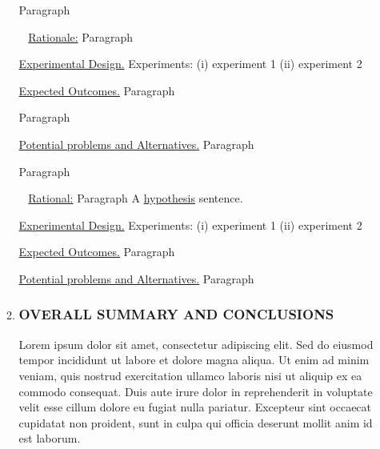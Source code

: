 \documentclass[11pt]{article}
\newcommand{\myparagraph}[1]{\vspace{0.5ex}\noindent{\bf #1} ~}
\begin{document}
\begin{enumerate}[wide, labelindent=0pt]
\begin{enumerate}[wide, labelindent=0pt]
        Paragraph

        \myparagraph{Aim 3.1 }
        \underline{Rationale:} 
        Paragraph

        \underline{Experimental Design.} 
        Experiments: 
        (i) experiment 1
        (ii) experiment 2

        \underline{Expected Outcomes.} 
        Paragraph

        Paragraph

        \underline{Potential problems and Alternatives.} 
        Paragraph

        Paragraph

        \myparagraph{Aim 3.2 }
        \underline{Rational:} 
        Paragraph
        A \underline{hypothesis} sentence.
        
        \underline{Experimental Design.} 
        Experiments: 
        (i) experiment 1
        (ii) experiment 2
        
        \underline{Expected Outcomes.}
        Paragraph

        \underline{Potential problems and Alternatives.} 
        Paragraph
        
        
    \item \subsubsection*{OVERALL SUMMARY AND CONCLUSIONS}
        Lorem ipsum dolor sit amet, consectetur adipiscing elit. Sed do eiusmod tempor incididunt ut labore et dolore magna aliqua. Ut enim ad minim veniam, quis nostrud exercitation ullamco laboris nisi ut aliquip ex ea commodo consequat. Duis aute irure dolor in reprehenderit in voluptate velit esse cillum dolore eu fugiat nulla pariatur. Excepteur sint occaecat cupidatat non proident, sunt in culpa qui officia deserunt mollit anim id est laborum.


\end{enumerate}
\end{enumerate}
\end{document}
